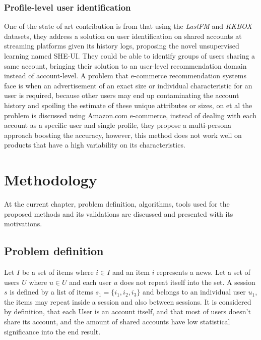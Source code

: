 \documentclass[ecp,tc,english]{iiufrgs}
\begin{document}
    \subsection{Profile-level user identification}
    One of the state of art contribution is from \cite{Jiang:2018:IUB:3209978.3210054} that using the \textit{LastFM} and \textit{KKBOX} datasets, they address a solution on user identification on shared accounts at streaming platforms given its history logs, proposing the novel unsupervised learning named SHE-UI. They could be able to identify groups of users sharing a same account, bringing their solution to an user-level recommendation domain instead of account-level.
    A problem that e-commerce recommendation systems face is when an advertisement of an exact size or individual characteristic for an user is required, because other users may end up contaminating the account history and spoiling the estimate of these unique attributes or sizes, on \cite{10.1145/3178876.3186149} et al the problem is discussed using Amazon.com e-commerce, instead of dealing with each account as a specific user and single profile, they propose a multi-persona approach boosting the accuracy, however, this method does not work well on products that have a high variability on its characteristics.


\chapter{Methodology}
At the current chapter, problem definition, algorithms, tools used for the proposed methods and its validations are discussed and presented with its motivations.

    \section{Problem definition}
    Let \(I \) be a set of items where \(i \in I \) and an item \(i\) represents a news. Let a set of users \(U\) where \(u \in U \) and each user \(u\) does not repeat itself into the set.
    A session \(s\) is defined by a list of items \(s_{1} = \{i_{1}, i_{2}, i_{3}\}\) and belongs to an individual user \(u_{1}\), the items may repeat inside a session and also between sessions.
    It is considered by definition, that each User is an account itself, and that most of users doesn't share its account, and the amount of shared accounts have low  statistical significance into the end result.
    
\end{document}
